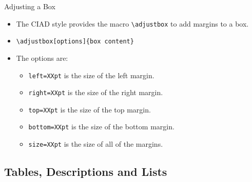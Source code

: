 \documentclass[english,sectioncirclenumberstyle]{ciadbeamer}
\begin{document}
\begin{frame}{Adjusting a Box}
	\begin{itemize}
	\item The CIAD style provides the macro \texttt{{\textbackslash}adjustbox} to add margins to a box.
	\vspace{1em}
	\item \texttt{{\textbackslash}adjustbox[options]\{box content\}}
	\vspace{1em}
	\item The options are:
		\begin{itemize}
		\item \texttt{left=XXpt} is the size of the left margin.
		\item \texttt{right=XXpt} is the size of the right margin.
		\item \texttt{top=XXpt} is the size of the top margin.
		\item \texttt{bottom=XXpt} is the size of the bottom margin.
		\item \texttt{size=XXpt} is the size of all of the margins.
		\end{itemize}
	\end{itemize}
\end{frame}

\subsection{Tables, Descriptions and Lists}
\subsectiontableofcontentslide
\end{document}
